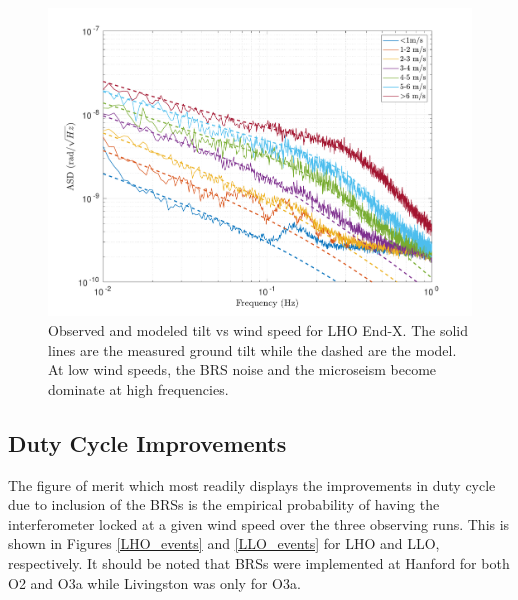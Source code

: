 \documentclass [12pt, proquest]{uwthesis}[2019]
\begin{document}
\begin{figure}[!h]
\begin{center}
\includegraphics[width=\textwidth]{TiltModel.pdf}
\caption[Observed and modeled tilt vs wind speed]{Observed and modeled tilt vs wind speed for LHO End-X. The solid lines are the measured ground tilt while the dashed are the model. At low wind speeds, the BRS noise and the microseism become dominate at high frequencies.}
\label{tiltModel}
\end{center}
\end{figure}

\subsection{Duty Cycle Improvements}

The figure of merit which most readily displays the improvements in duty cycle due to inclusion of the BRSs is the empirical probability of having the interferometer locked at a given wind speed over the three observing runs. This is shown in Figures \ref{LHO_events} and \ref{LLO_events} for LHO and LLO, respectively. It should be noted that BRSs were implemented at Hanford for both O2 and O3a while Livingston was only for O3a.
\end{document}
